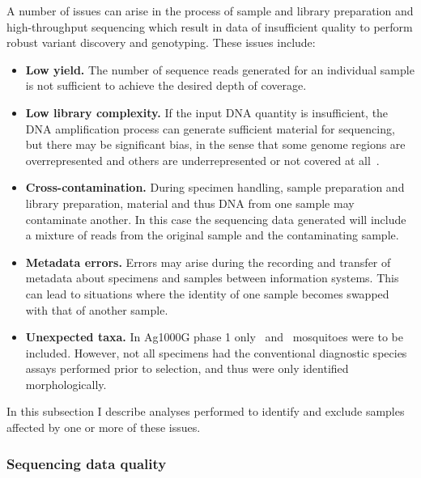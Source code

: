 \begin{refsection}
%
A number of issues can arise in the process of sample and library preparation and high-throughput sequencing which result in data of insufficient quality to perform robust variant discovery and genotyping.
%
These issues include:
%
\begin{itemize}
%
\item \textbf{Low yield.} The number of sequence reads generated for an individual sample is not sufficient to achieve the desired depth of coverage.
%
\item \textbf{Low library complexity.} If the input DNA quantity is insufficient, the DNA amplification process can generate sufficient material for sequencing, but there may be significant bias, in the sense that some genome regions are overrepresented and others are underrepresented or not covered at all~\parencite{Head2014}.
%
\item \textbf{Cross-contamination.} During specimen handling, sample preparation and library preparation, material and thus DNA from one sample may contaminate another.
%
In this case the sequencing data generated will include a mixture of reads from the original sample and the contaminating sample.
%
\item \textbf{Metadata errors.} Errors may arise during the recording and transfer of metadata about specimens and samples between information systems.
%
This can lead to situations where the identity of one sample becomes swapped with that of another sample.
%
\item \textbf{Unexpected taxa.} In Ag1000G phase 1 only \agam\ and \acol\ mosquitoes were to be included.
%
However, not all specimens had the conventional diagnostic species assays performed prior to selection, and thus were only identified morphologically.
\end{itemize}
%
In this subsection I describe analyses performed to identify and exclude samples affected by one or more of these issues.


\subsubsection{Sequencing data quality}



\end{refsection}
